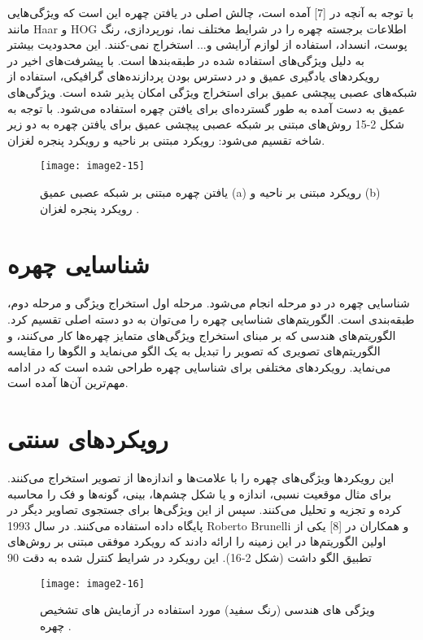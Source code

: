 با توجه به آنچه در [7] آمده است، چالش اصلی در یافتن چهره این است که ویژگی‌هایی مانند Haar و HOG اطلاعات برجسته چهره را در شرایط مختلف نما، نورپردازی، رنگ پوست، انسداد، استفاده از لوازم آرایشی و... استخراج نمی-کنند. این محدودیت بیشتر به دلیل ویژگی‌های استفاده شده در طبقه‌بندها است. با پیشرفت‌های اخیر در رویکردهای یادگیری عمیق و در دسترس بودن پردازنده‌های گرافیکی، استفاده از شبکه‌های عصبی پیچشی عمیق برای استخراج ویژگی امکان پذیر شده است. ویژگی‌های عمیق به دست آمده به طور گسترده‌ای برای یافتن چهره استفاده می‌شود. با توجه به شکل 2-15 روش‌های مبتنی بر شبکه عصبی پیچشی عمیق برای یافتن چهره به دو زیر شاخه تقسیم می‌شود: رویکرد مبتنی بر ناحیه و رویکرد پنجره لغزان.

\begin{figure}[h]
\centering
  \texttt{[image: image2-15]}
  \caption{یافتن چهره مبتنی بر شبکه عصبی عمیق (a) رویکرد مبتنی بر ناحیه و (b) رویکرد پنجره لغزان \cite{ref1}.}
  \label{image2-15}
\end{figure}

\section{شناسایی چهره}
شناسایی چهره در دو مرحله انجام می‌شود. مرحله اول استخراج ویژگی و مرحله دوم، طبقه‌بندی است. الگوریتم‌های شناسایی چهره را می‌توان به دو دسته اصلی تقسیم کرد. الگوریتم‌های هندسی که بر مبنای استخراج ویژگی‌های متمایز چهره‌ها کار می‌کنند، و الگوریتم‌های تصویری که تصویر را تبدیل به یک الگو می‌نماید و الگوها را مقایسه می‌نماید. رویکردهای مختلفی برای شناسایی چهره طراحی شده است که در ادامه مهم‌ترین آن‌ها آمده است.

\section{رویکرد‌های سنتی}
این رویکردها ویژگی‌های چهره را با علامت‌ها و اندازه‌ها از تصویر استخراج می‌کنند. برای مثال موقعیت نسبی، اندازه و یا شکل چشم‌ها، بینی، گونه‌‌ها و فک را محاسبه کرده و تجزیه و تحلیل می‌کنند. سپس از این ویژگی‌ها برای جستجوی تصاویر دیگر در پایگاه داده استفاده می‌کنند. در سال 1993 Roberto Brunelli و همکاران در [8] یکی از اولین الگوریتم‌ها در این زمینه را ارائه دادند که رویکرد‌ موفقی مبتنی بر روش‌های تطبیق الگو داشت (شکل 2-16). این رویکرد در شرایط کنترل شده به دقت 90%
 
 \begin{figure}[h]
\centering
  \texttt{[image: image2-16]}
  \caption{ویژگی های هندسی (رنگ سفید) مورد استفاده در آزمایش های تشخیص چهره \cite{ref1}.}
  \label{image2-16}
\end{figure}

